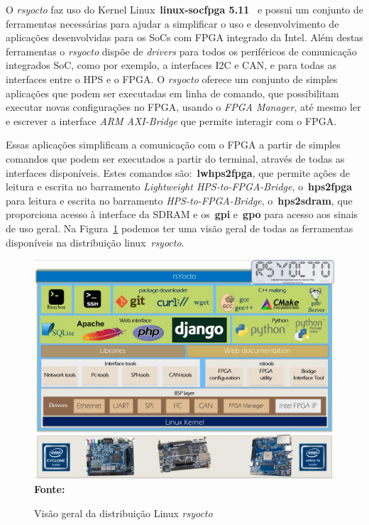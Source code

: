 O \textit{rsyocto} faz uso do Kernel Linux~\textbf{linux-socfpga 5.11}~\cite{linuxsocfpga} e possui um conjunto de ferramentas necessárias para ajudar a simplificar o uso e desenvolvimento de aplicações desenvolvidas para os SoCs com FPGA integrado da Intel. Além destas ferramentas o \textit{rsyocto} dispõe de \textit{drivers} para todos os periféricos de comunicação integrados SoC, como por exemplo, a interfaces I2C e CAN, e para todas as interfaces entre o HPS e o FPGA\@. O \textit{rsyocto} oferece um conjunto de simples aplicações que podem ser executadas em linha de comando, que possibilitam executar novas configurações no FPGA, usando o \textit{FPGA Manager}, até mesmo ler e escrever a interface \textit{ARM AXI-Bridge} que permite interagir com o FPGA\@. 

Essas aplicações simplificam a comunicação com o FPGA a partir de simples comandos que podem ser executados a partir do terminal, através de todas as interfaces disponíveis. Estes comandos são:~\textbf{lwhps2fpga}, que permite ações de leitura e escrita no barramento \textit{Lightweight HPS-to-FPGA-Bridge}, o~\textbf{hps2fpga} para leitura e escrita no barramento \textit{HPS-to-FPGA-Bridge}, o~\textbf{hps2sdram}, que proporciona acesso à interface da SDRAM e os~\textbf{gpi} e~\textbf{gpo} para acesso aos sinais de uso geral. Na Figura~\ref{fig:rsyocto} podemos ter uma visão geral de todas as ferramentas disponíveis na distribuição linux~\textit{rsyocto}.


\begin{figure}[ht]
	\caption{Visão geral da distribuição Linux \textit{rsyocto}}
	\begin{center}
		\includegraphics[scale=0.55]{imagens/rsYoctoLayers.jpg}\\
		{\small \textbf{Fonte:}\cite{rsyocto}}
    \end{center}\label{fig:rsyocto}
\end{figure}

